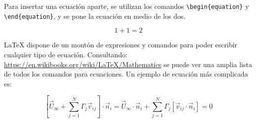 Para insertar una ecuación aparte, se utilizan los comandos \verb!\begin{equation}! y \verb!\end{equation}!, y se pone la ecuación en medio de los dos.

\begin{equation}
1+1=2
\end{equation}

LaTeX dispone de un montón de expresiones y comandos para poder escribir cualquier tipo de ecuación. Consultando: \url{https://en.wikibooks.org/wiki/LaTeX/Mathematics} se puede ver una amplia lista de todos los comandos para ecuaciones. Un ejemplo de ecuación más complicada es:

\begin{equation}
\left[\vec{U}_{\infty}+\sum_{j=1}^{N}\Gamma_{j}\vec{v}_{ij}\right]\cdot\vec{n}_{i}=\vec{U}_{\infty}\cdot\vec{n}_{i}+\sum_{j=1}^{N}\Gamma_{j}\left[\vec{v}_{ij}\cdot\vec{n}_{i}\right]=0
\end{equation}